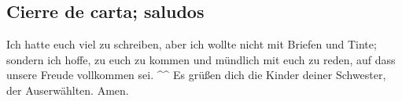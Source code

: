\hypertarget{cierre-de-carta-saludos}{%
\subsection{Cierre de carta; saludos}\label{cierre-de-carta-saludos}}

 Ich hatte euch viel zu schreiben, aber ich wollte nicht
mit Briefen und Tinte; sondern ich hoffe, zu euch zu kommen und mündlich
mit euch zu reden, auf dass unsere Freude vollkommen sei. \^{}\^{}
 Es grüßen dich die Kinder deiner Schwester, der
Auserwählten. Amen.
